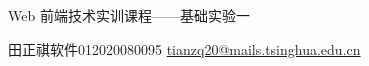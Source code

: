 
\vspace*{\fill}

\begin{center}

    \Huge Web 前端技术实训课程——基础实验一

    \vspace{2em}
    
    \normalsize

    田正祺\hspace{1em}软件01\hspace{1em}2020080095 \hspace{1em}\href{mailto:tianzq20@mails.tsinghua.edu.cn}{tianzq20@mails.tsinghua.edu.cn}
    
\end{center}

\vspace*{\fill}

\newpage

